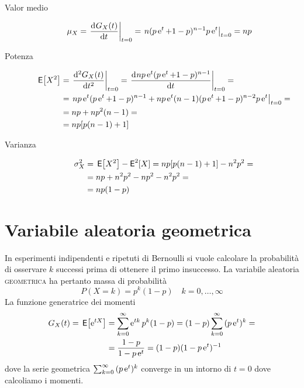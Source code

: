 \begin{description}
\item[Valor medio]
\begin{equation}\begin{split}
\mu_X&=\restrict{\deriv{G_X(t)}{t}}{t=0}=\restrict{n(p\e{t}+1-p)^{n-1}p\e{t}}{t=0}=n p\end{split}\end{equation}
\item[Potenza]
\begin{equation}\begin{split}
\E{X^2}&=\restrict{\deriv[2]{G_X(t)}{t}}{t=0}=\restrict{\deriv{np\e{t}(p\e{t}+1-p)^{n-1}}{t}}{t=0}=\\
&=\restrict{np\e{t}(p\e{t}+1-p)^{n-1}+np\e{t}(n-1)(p\e{t}+1-p)^{n-2}p\e{t}}{t=0}=\\
&=np+np^2(n-1)=\\
&=np[p(n-1)+1]
\end{split}\end{equation}
\item[Varianza]
\begin{equation}\begin{split}
\sigma^2_X&=\E{X^2}-\Esp^2[X]=np[p(n-1)+1]-n^2p^2=\\
&=np+n^2p^2-np^2-n^2p^2=\\
&=np(1-p)\end{split}
\end{equation}
\end{description}

\section{Variabile aleatoria geometrica}
In esperimenti indipendenti e ripetuti di Bernoulli si vuole calcolare la probabilità di osservare $k$ successi prima di ottenere il primo insuccesso. La variabile aleatoria \textsc{geometrica} ha pertanto massa di probabilità
\begin{equation}
P(X=k)=p^k(1-p)\quad k=0,\dots,\infty
\end{equation}
La funzione generatrice dei momenti
\[\begin{split}G_X(t)=\E{\e{t X}}&=\sum_{k=0}^{\infty}{\e{t k}p^k(1-p)}=(1-p)\sum_{k=0}^{\infty}{(p\e{t})^k}=\\
&=\frac{1-p}{1-p\e{t}}=(1-p)(1-p\e{t})^{-1}\end{split}\]
dove la serie geometrica $\sum_{k=0}^{\infty}{(p\e{t})^k}$ converge in un intorno di $t=0$ dove calcoliamo i momenti.

